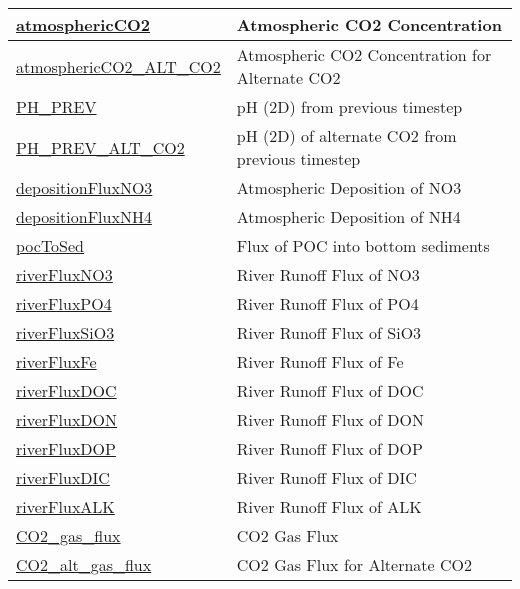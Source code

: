 {\begin{center}
\begin{longtable}{| p{2.0in} | p{4.0in} |}
    \hline
    \hyperref[subsec:var_sec_forcing_atmosphericCO2]{atmosphericCO2} & Atmospheric CO2 Concentration \\
    \hline
    \hyperref[subsec:var_sec_forcing_atmosphericCO2_ALT_CO2]{atmosphericCO2\_ALT\_CO2} & Atmospheric CO2 Concentration for Alternate CO2 \\
    \hline
    \hyperref[subsec:var_sec_forcing_PH_PREV]{PH\_PREV} & pH (2D) from previous timestep \\
    \hline
    \hyperref[subsec:var_sec_forcing_PH_PREV_ALT_CO2]{PH\_PREV\_ALT\_CO2} & pH (2D) of alternate CO2 from previous timestep \\
    \hline
    \hyperref[subsec:var_sec_forcing_depositionFluxNO3]{depositionFluxNO3} & Atmospheric Deposition of NO3 \\
    \hline
    \hyperref[subsec:var_sec_forcing_depositionFluxNH4]{depositionFluxNH4} & Atmospheric Deposition of NH4 \\
    \hline
    \hyperref[subsec:var_sec_forcing_pocToSed]{pocToSed} & Flux of POC into bottom sediments \\
    \hline
    \hyperref[subsec:var_sec_forcing_riverFluxNO3]{riverFluxNO3} & River Runoff Flux of NO3 \\
    \hline
    \hyperref[subsec:var_sec_forcing_riverFluxPO4]{riverFluxPO4} & River Runoff Flux of PO4 \\
    \hline
    \hyperref[subsec:var_sec_forcing_riverFluxSiO3]{riverFluxSiO3} & River Runoff Flux of SiO3 \\
    \hline
    \hyperref[subsec:var_sec_forcing_riverFluxFe]{riverFluxFe} & River Runoff Flux of Fe \\
    \hline
    \hyperref[subsec:var_sec_forcing_riverFluxDOC]{riverFluxDOC} & River Runoff Flux of DOC \\
    \hline
    \hyperref[subsec:var_sec_forcing_riverFluxDON]{riverFluxDON} & River Runoff Flux of DON \\
    \hline
    \hyperref[subsec:var_sec_forcing_riverFluxDOP]{riverFluxDOP} & River Runoff Flux of DOP \\
    \hline
    \hyperref[subsec:var_sec_forcing_riverFluxDIC]{riverFluxDIC} & River Runoff Flux of DIC \\
    \hline
    \hyperref[subsec:var_sec_forcing_riverFluxALK]{riverFluxALK} & River Runoff Flux of ALK \\
    \hline
    \hyperref[subsec:var_sec_forcing_CO2_gas_flux]{CO2\_gas\_flux} & CO2 Gas Flux \\
    \hline
    \hyperref[subsec:var_sec_forcing_CO2_alt_gas_flux]{CO2\_alt\_gas\_flux} & CO2 Gas Flux for Alternate CO2 \\

\end{longtable}
\end{center}}
